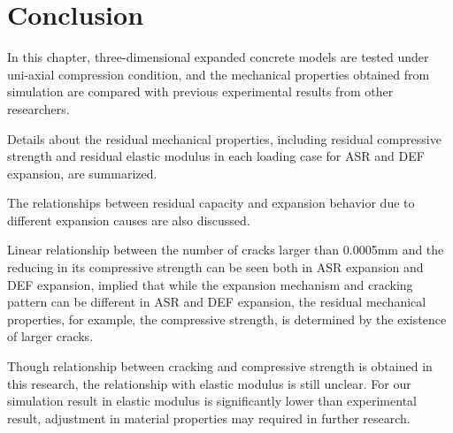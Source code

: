 \section{Conclusion}

In this chapter, three-dimensional expanded concrete models are tested under uni-axial compression condition, and the mechanical properties obtained from simulation are compared with previous experimental results from other researchers.

Details about the residual mechanical properties, including residual compressive strength and residual elastic modulus in each loading case for ASR and DEF expansion, are summarized.

The relationships between residual capacity and expansion behavior due to different expansion causes are also discussed.

Linear relationship between the number of cracks larger than 0.0005mm and the reducing in its compressive strength can be seen both in ASR expansion and DEF expansion, implied that while the expansion mechanism and cracking pattern can be different in ASR and DEF expansion, the residual mechanical properties, for example, the compressive strength, is determined by the existence of larger cracks.

Though relationship between cracking and compressive strength is obtained in this research, the relationship with elastic modulus is still unclear. For our simulation result in elastic modulus is significantly lower than experimental result, adjustment in material properties may required in further research.
